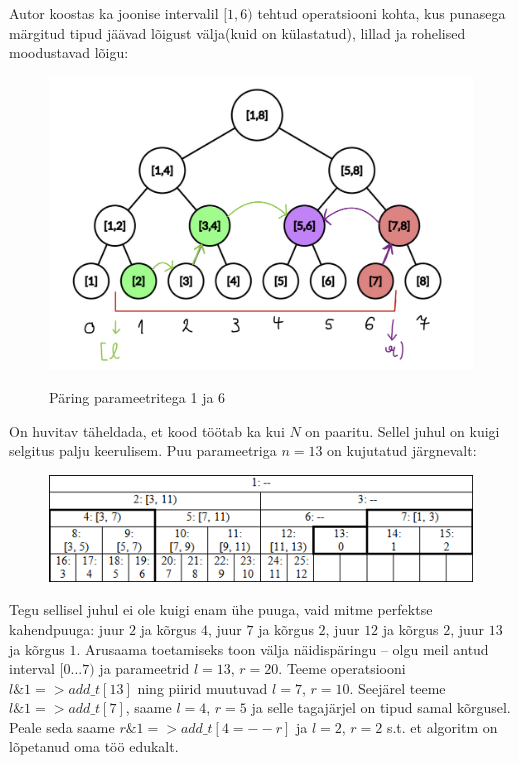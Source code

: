 \documentclass{trkut}
\begin{document}
Autor koostas ka joonise intervalil $[1, 6)$ tehtud operatsiooni kohta, kus punasega märgitud tipud jäävad lõigust välja(kuid on külastatud), lillad ja rohelised moodustavad lõigu:
\begin{figure}[H]%
    \includegraphics[width=12cm]{jonis2.png}%
    \caption{Päring parameetritega 1 ja 6}%
    \label{joonis}%
\end{figure}


On huvitav täheldada, et kood töötab ka kui $N$ on paaritu. \parencite{cfpuu}
Sellel juhul on kuigi selgitus palju keerulisem. 
Puu parameetriga $n=13$ on kujutatud järgnevalt:
\begin{figure}[H]%
    \includegraphics[width=12cm]{LIHTPUU2.png}%
    \caption{}%
    \label{joonis}%
\end{figure}

Tegu sellisel juhul ei ole kuigi enam ühe puuga, vaid mitme perfektse kahendpuuga: juur $2$ ja kõrgus $4$, juur $7$ ja kõrgus $2$, juur $12$ ja kõrgus $2$, juur $13$ ja kõrgus $1$. 
Arusaama toetamiseks toon välja näidispäringu -- olgu meil antud interval $[0...7)$ ja parameetrid $l=13$, $r=20$. Teeme operatsiooni $l\&1 => add\_t[13]$ ning piirid muutuvad $l=7$, $r=10$. Seejärel teeme $l\&1 => add\_t[7]$, saame $l=4$, $r=5$ ja selle tagajärjel on tipud samal kõrgusel. Peale seda saame $r\&1 => add\_t[4 = --r]$ ja $l=2$, $r=2$ s.t. et algoritm on lõpetanud oma töö edukalt. \parencite{cfpuu}
\end{document}
